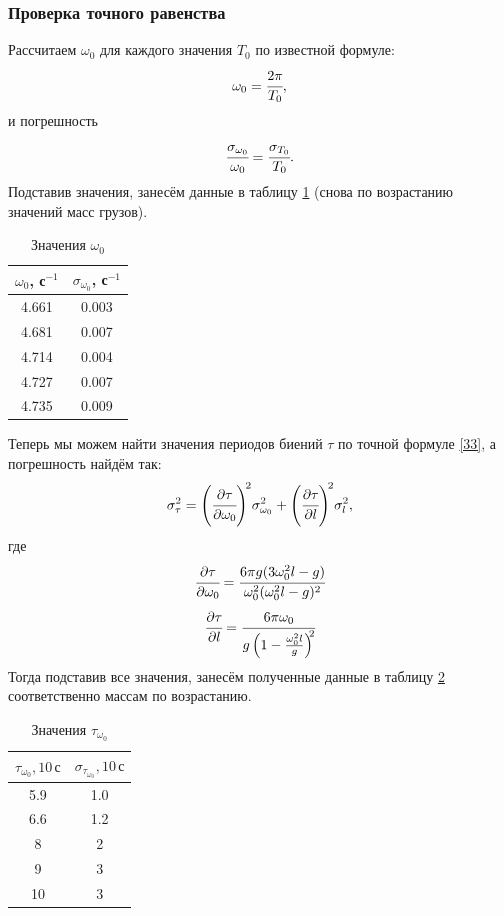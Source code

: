 \documentclass[a4paper,12pt]{article}
\theoremstyle{plain} %
\theoremstyle{definition} %
\theoremstyle{remark} %
\begin{document}
\subsubsection{Проверка точного равенства}
Рассчитаем $\omega_0$ для каждого значения $T_0$ по известной формуле:
$$ \omega_0=\cfrac{2\pi}{T_0},$$
и погрешность
$$\cfrac{\sigma_{\omega_0}}{\omega_0}=\cfrac{\sigma_{T_0}}{T_0}.$$
Подставив значения, занесём данные в таблицу \ref{my-label3} (снова по возрастанию значений масс грузов).
\begin{table}[h!]
	\centering
	\caption{Значения $\omega_0$}
	\label{my-label3}
	\begin{tabular}{|c|c|}
		\hline
		$\omega_0$, с$^{-1}$ & $\sigma_{\omega_0}$, с$^{-1}$ \\ \hline
		4.661                & 0.003                         \\ \hline
		4.681                & 0.007                         \\ \hline
		4.714                & 0.004                         \\ \hline
		4.727                & 0.007                         \\ \hline
		4.735                & 0.009                         \\ \hline
	\end{tabular}
\end{table}

Теперь мы можем найти значения периодов биений $\tau$ по точной формуле \eqref{33}, а погрешность найдём так:
\begin{equation}
\sigma^2_{\tau}=\left(\cfrac{\partial\tau}{\partial \omega_0}\right)^{\!2}\!\sigma^2_{\omega_0}+\left(\cfrac{\partial\tau}{\partial l}\right)^{\!2}\!\sigma^2_{l},
\label{36}
\end{equation}
где
$$\cfrac{\partial\tau}{\partial \omega_0}=\cfrac{6\pi g(3\omega^2_0 l-g)}{\omega^2_0(\omega^2_0 l-g)^2}$$
$$\cfrac{\partial\tau}{\partial l}=\cfrac{6\pi\omega_0}{g\left(1-\frac{\omega^2_0l}{g}\right)^{\!\!2}}$$
Тогда подставив все значения, занесём полученные данные в таблицу \ref{my-label5} соответственно массам по возрастанию.
\begin{table}[h!]
	\centering
	\caption{Значения $\tau_{\omega_0}$}
	\label{my-label5}
	\begin{tabular}{|c|c|}
		\hline
		$\tau_{\omega_0}, 10\,\text{с}$ & $\sigma_{\tau_{\omega_0}}, 10\,\text{с}$ \\[0.5mm] \hline
		5.9                             & 1.0                                      \\ \hline
		6.6                             & 1.2                                      \\ \hline
		8                               & 2                                        \\ \hline
		9                               & 3                                        \\ \hline
		10                              & 3                                        \\ \hline
	\end{tabular}
\end{table}
\end{document}
